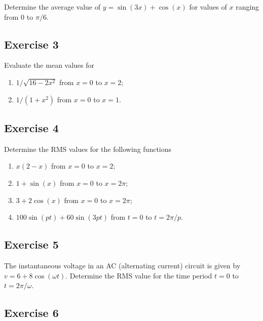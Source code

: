 \documentclass[
  11pt,
  oneside]{book}
\providecommand{\tightlist}{%
  \setlength{\itemsep}{0pt}\setlength{\parskip}{0pt}}
\newcommand{\slide}{}
\theoremstyle{definition}
\theoremstyle{definition}
\theoremstyle{definition}
\theoremstyle{definition}
\theoremstyle{remark}
\begin{document}
Determine the average value of \(y = \sin(3x) + \cos(x)\) for values of \(x\) ranging from \(0\) to \(\pi/6\).

\slide

\subsection*{Exercise 3}\label{exercise-3-7}

Evaluate the mean values for

\begin{enumerate}
\def\labelenumi{\roman{enumi}.}
\tightlist
\item
  \(1/\sqrt{16-2x^2}\) from \(x=0\) to \(x=2\);
\item
  \(1/(1+x^2)\) from \(x=0\) to \(x=1\).
\end{enumerate}

\slide

\subsection*{Exercise 4}\label{exercise-4-5}

Determine the RMS values for the following functions

\begin{enumerate}
\def\labelenumi{\roman{enumi}.}
\tightlist
\item
  \(x(2-x)\) from \(x=0\) to \(x=2\);
\item
  \(1+\sin(x)\) from \(x=0\) to \(x=2\pi\);
\item
  \(3+2\cos(x)\) from \(x=0\) to \(x=2\pi\);
\item
  \(100\sin(pt)+60\sin(3pt)\) from \(t=0\) to \(t=2\pi/p\).
\end{enumerate}

\slide

\subsection*{Exercise 5}\label{exercise-5-4}

The instantaneous voltage in an AC (alternating current) circuit is given by \(v = 6 + 8\cos(\omega t)\).
Determine the RMS value for the time period \(t = 0\) to \(t = 2\pi/\omega\).

\slide

\subsection*{Exercise 6}\label{exercise-6-4}
\end{document}
